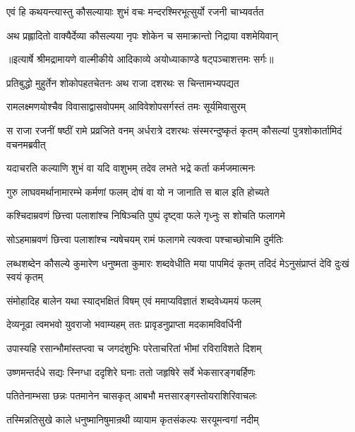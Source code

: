 \twolineshloka
{एवं हि कथयन्त्यास्तु कौसल्यायाः शुभं वचः}
{मन्दरश्मिरभूत्सुर्यो रजनी चाभ्यवर्तत} %

\twolineshloka
{अथ प्रह्लादितो वाक्यैर्देव्या कौसल्यया नृपः}
{शोकेन च समाक्रान्तो निद्राया वशमेयिवान्} %


{॥इत्यार्षे श्रीमद्रामायणे वाल्मीकीये आदिकाव्ये अयोध्याकाण्डे षट्पञ्चाशत्तमः सर्गः॥}


\twolineshloka
{प्रतिबुद्धो मुहुर्तेन शोकोपहतचेतनः}
{अथ राजा दशरथः स चिन्तामभ्यपद्यत} %

\twolineshloka
{रामलक्ष्मणयोश्चैव विवासाद्वासवोपमम्}
{आविवेशोपसर्गस्तं तमः सूर्यमिवासुरम्} %

\threelineshloka
{स राजा रजनीं षष्ठीं रामे प्रव्रजिते वनम्}
{अर्धरात्रे दशरथः संस्मरन्दुष्कृतं कृतम्}
{कौसल्यां पुत्रशोकार्तामिदं वचनमब्रवीत्} %

\twolineshloka
{यदाचरति कल्याणि शुभं वा यदि वाशुभम्}
{तदेव लभते भद्रे कर्ता कर्मजमात्मनः} %

\twolineshloka
{गुरु लाघवमर्थानामारम्भे कर्मणां फलम्}
{दोषं वा यो न जानाति स बाल इति होच्यते} %

\twolineshloka
{कश्चिदाम्रवणं छित्त्वा पलाशांश्च निषिञ्चति}
{पुष्पं दृष्ट्वा फले गृध्नुः स शोचति फलागमे} %

\twolineshloka
{सोऽहमाम्रवणं छित्त्वा पलाशांश्च न्यषेचयम्}
{रामं फलागमे त्यक्त्वा पश्चाच्छोचामि दुर्मतिः} %

\threelineshloka
{लब्धशब्देन कौसल्ये कुमारेण धनुष्मता}
{कुमारः शब्दवेधीति मया पापमिदं कृतम्}
{तदिदं मेऽनुसंप्राप्तं देवि दुःखं स्वयं कृतम्} %

\twolineshloka
{संमोहादिह बालेन यथा स्याद्भक्षितं विषम्}
{एवं ममाप्यविज्ञातं शब्दवेध्यमयं फलम्} %

\twolineshloka
{देव्यनूढा त्वमभवो युवराजो भवाम्यहम्}
{ततः प्रावृडनुप्राप्ता मदकामविवर्धिनी} %

\twolineshloka
{उपास्यहि रसान्भौमांस्तप्त्वा च जगदंशुभिः}
{परेताचरितां भीमां रविराविशते दिशम्} %

\twolineshloka
{उष्णमन्तर्दधे सद्यः स्निग्धा ददृशिरे घनाः}
{ततो जहृषिरे सर्वे भेकसारङ्गबर्हिणः} %

\twolineshloka
{पतितेनाम्भसा छन्नः पतमानेन चासकृत्}
{आबभौ मत्तसारङ्गस्तोयराशिरिवाचलः} %

\twolineshloka
{तस्मिन्नतिसुखे काले धनुष्मानिषुमान्रथी}
{व्यायाम कृतसंकल्पः सरयूमन्वगां नदीम्} %

